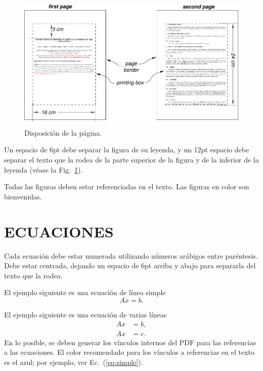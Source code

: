 \documentclass[oneside,a4paper,spanish,links]{amca}
\begin{document}
\begin{figure}[htb]
\centerline{\includegraphics{firstpage}} \caption{Disposición de
la página.} \label{fg:figura}
\end{figure}

Un espacio de 6pt debe separar la figura de su leyenda, y un 12pt
espacio debe separar el texto que la rodea de la parte superior de
la figura y de la inferior de la leyenda (véase la
Fig.~\ref{fg:figura}).

Todas las figuras deben estar referenciadas en el texto. Las
figuras en color son bienvenidas.

\section{ECUACIONES}

Cada ecuación debe estar numerada utilizando números arábigos
entre paréntesis. Debe estar centrada, dejando un espacio de 6pt
arriba y abajo para separarla del texto que la rodea.

El ejemplo siguiente es una ecuación de línea simple
%
\begin{equation}
Ax = b.
\end{equation}

El ejemplo siguiente es una ecuación de varias líneas
%
\begin{equation} \label{eq:simple}
\begin{aligned}
Ax& = b,\\
Ax& = c.
\end{aligned}
\end{equation}
%
En lo posible, se deben generar los vínculos internos del PDF para
las referencias a las ecuaciones. El color recomendado para los
vínculos a referencias en el texto es el azul; por ejemplo, ver
Ec.~(\ref{eq:simple}).
\end{document}

